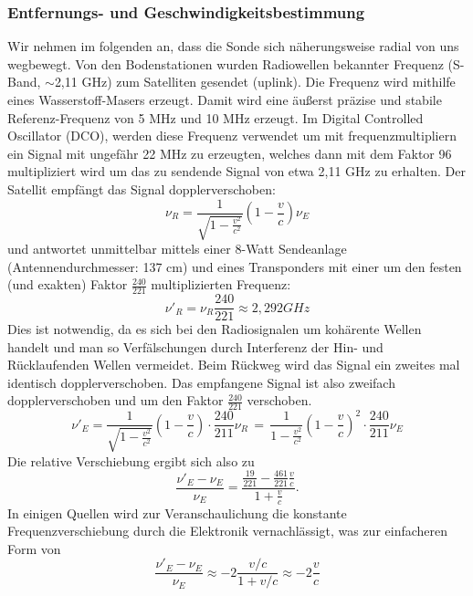 \subsubsection{Entfernungs- und Geschwindigkeitsbestimmung }
Wir nehmen im folgenden an, dass die Sonde sich näherungsweise radial von uns wegbewegt.
Von den Bodenstationen wurden Radiowellen bekannter Frequenz (S-Band, $\sim$2,11 GHz) zum Satelliten gesendet (uplink).
Die Frequenz wird mithilfe eines Wasserstoff-Masers erzeugt.
Damit wird eine äußerst präzise und stabile Referenz-Frequenz von 5 MHz und 10 MHz erzeugt. Im Digital Controlled Oscillator (DCO), werden diese Frequenz verwendet um mit frequenzmultipliern ein Signal mit ungefähr 22 MHz zu erzeugten, welches dann mit dem Faktor 96 multipliziert wird um das zu sendende Signal von etwa 2,11 GHz zu erhalten.\cite{Anderson2002}
Der Satellit empfängt das Signal dopplerverschoben:
\begin{equation}
\label{equ:doppler1}
 \nu_R = \frac{1}{\sqrt{1-\frac{v^2}{c^2}}}(1-\frac{v}{c})\nu_E
\end{equation}
und antwortet unmittelbar mittels einer 8-Watt Sendeanlage (Antennendurchmesser: 137 cm\cite{Markwardt2002}) und eines Transponders
mit einer um den festen (und exakten) Faktor $ \frac{240}{221} $ multiplizierten Frequenz:
\begin{equation}
\label{equ:Faktor}
\nu'_R = \nu_R\frac{240}{221} \approx 2,292 GHz
\end{equation}
Dies ist notwendig, da es sich bei den Radiosignalen um kohärente Wellen handelt und man so Verfälschungen durch Interferenz der Hin- und Rücklaufenden Wellen vermeidet.\cite{Anderson2002}
Beim Rückweg wird das Signal ein zweites mal identisch dopplerverschoben.
Das empfangene Signal ist also zweifach dopplerverschoben und um den Faktor $\frac{240}{221}$ verschoben.
\begin{equation}
 \nu'_E = \frac{1}{\sqrt{1-\frac{v^2}{c^2}}}(1-\frac{v}{c}) \cdot \frac{240}{211}\nu_R \, = \,
\frac{1}{1-\frac{v^2}{c^2}}(1-\frac{v}{c})^2 \cdot \frac{240}{211} \nu_E
\end{equation}
Die relative Verschiebung ergibt sich also zu
\begin{equation}\label{equ:rel}
 \frac{\nu'_E-\nu_E}{\nu_E} = \frac{\frac{19}{221}- \frac{461}{221}\frac{v}{c}}{1+\frac{v}{c}}.
\end{equation}
In einigen Quellen wird zur Veranschaulichung die konstante Frequenzverschiebung durch die Elektronik
vernachlässigt, was zur einfacheren Form von
\begin{equation}\label{equ:einf_rel}
 \frac{\nu'_E-\nu_E}{\nu_E} \approx -2\frac{v/c}{1+v/c} \approx -2 \frac{v}{c}
\end{equation}
